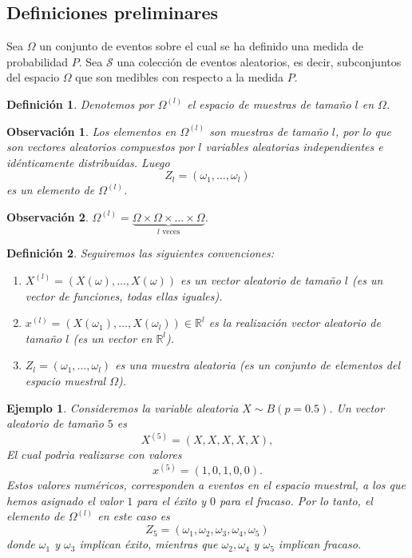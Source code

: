 \documentclass{report}
\newtheorem{dfn}{Definición}[section]
\newtheorem{obs}{Observación}[section]
\newtheorem{ej}{Ejemplo}[section]
\begin{document}
\subsection{Definiciones preliminares}

Sea \( \Omega \) un conjunto de eventos sobre el cual se ha definido una medida de probabilidad \( P \). Sea \( \mathcal{S} \) una colección de eventos 
aleatorios, es decir, subconjuntos del espacio \( \Omega \) que son medibles con respecto 
a la medida \( P \). \newline
\begin{dfn}
    Denotemos por \( \Omega^{(l)} \) el espacio de muestras de tamaño \( l \) en \( \Omega \). 
\end{dfn}

\begin{obs}
Los elementos en  \( \Omega^{(l)} \) son muestras de tamaño $l$, por lo que son vectores
aleatorios compuestos por $l$ variables aleatorias independientes e idénticamente distribuídas.
Luego
$$
Z_l = (\omega_1, \ldots, \omega_l)
$$
es un elemento de \( \Omega^{(l)} \).
\end{obs}

\begin{obs}
    \( \Omega^{(l)} = \underbrace{\Omega \times \Omega \times \ldots \times \Omega}_{l \text{ veces}} \).
\end{obs}

\begin{dfn}
Seguiremos las siguientes convenciones:
\begin{enumerate}
    \item $X^{(l)} = (X(\omega),\ldots,X(\omega))$ es un vector aleatorio de tamaño $l$ (es un vector de funciones, todas ellas iguales).
    \item $x^{(l)} = (X(\omega_1),\ldots,X(\omega_l)) \in \mathbb{R}^l$ es la realización vector aleatorio de tamaño $l$ (es un vector en $\mathbb{R}^l$).
    \item $Z_l = (\omega_1,\ldots,\omega_l)$ es una muestra aleatoria (es un conjunto de elementos del espacio muestral $\Omega$).
\end{enumerate}
\end{dfn}

\begin{ej}
    Consideremos la variable aleatoria $X\sim B(p=0.5)$. Un vector aleatorio de tamaño $5$ es
    $$
    X^{(5)} = (X,X,X,X,X),
    $$
    El cual podria realizarse con valores
    $$
    x^{(5)} = (1,0,1,0,0).
    $$
    Estos valores numéricos, corresponden a eventos en el espacio muestral, a los que hemos asignado el valor $1$
    para el éxito y $0$ para el fracaso. Por lo tanto, el elemento de $\Omega^{(l)}$ en este caso es
    $$
    Z_{5}=(\omega_1, \omega_2, \omega_3, \omega_4, \omega_5)
    $$
    donde $\omega_1$ y $\omega_3$ implican éxito, mientras que $\omega_2, \omega_4$ y $\omega_5$ implican fracaso.
\end{ej}
\end{document}
